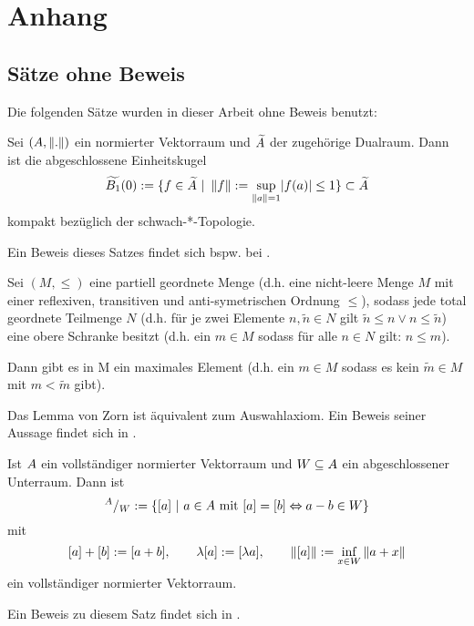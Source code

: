 \appendix

\section{Anhang}
\subsection{Sätze ohne Beweis}
Die folgenden Sätze wurden in dieser Arbeit ohne Beweis benutzt:

\begin{satz}\label{satz:BA}
Sei $(A, \left\lVert.\right\rVert)$ ein normierter Vektorraum und $\widetilde{A}$ der zugehörige Dualraum. Dann ist die abgeschlossene Einheitskugel
 \[\widetilde{B_1}(0) := \{f \in \widetilde{A} ~|~ \left\lVert f\right\rVert := \underset{\left\lVert a\right\rVert = 1}{\sup}|f(a)| \leq 1\} \subset \widetilde{A}\]
kompakt bezüglich der schwach-*-Topologie.
\end{satz}

Ein Beweis dieses Satzes findet sich bspw. bei \cite[Theorem VIII.3.11 \& Korollar VIII.3.12]{Werner2011}.


\begin{satz}\label{satz:LZ}
Sei $(M, \leq)$ eine partiell geordnete Menge (d.h. eine nicht-leere Menge $M$ mit einer reflexiven, transitiven und anti-symetrischen Ordnung $\leq$), sodass jede total geordnete Teilmenge $N$ (d.h. für je zwei Elemente $n, \tilde{n} \in N$ gilt $\tilde{n} \leq n \vee n \leq \tilde{n}$) eine obere Schranke besitzt (d.h. ein $m \in M$ sodass für alle $n \in N$ gilt: $n \leq m$).

Dann gibt es in M ein maximales Element (d.h. ein $m \in M$ sodass es kein $\tilde{m} \in M$ mit $m < \tilde{m}$ gibt).
\end{satz}

Das Lemma von Zorn ist äquivalent zum Auswahlaxiom. Ein Beweis seiner Aussage findet sich in \cite[S. 214f]{Jaenich2008}.

\begin{satz}\label{satz:Quotient}
Ist $A$ ein vollständiger normierter Vektorraum und $W \subseteq A$ ein abgeschlossener Unterraum. Dann ist 
	\[^A/_W := \{[a] ~|~ a \in A \text{ mit } [a] = [b] \Leftrightarrow a-b \in W\}\]
mit
	\[[a] + [b] := [a+b],\qquad \lambda[a] := [\lambda a],\qquad \left\lVert[a]\right\rVert := \inf_{x \in W}\left\lVert a+x\right\rVert\]
ein vollständiger normierter Vektorraum.
\end{satz}

Ein Beweis zu diesem Satz findet sich in \cite[Satz I.3.2]{Werner2011}.

